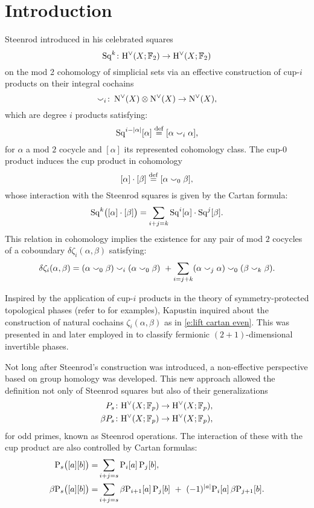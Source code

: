
\section{Introduction} \label{s:introduction}

Steenrod introduced in \cite{steenrod1947products} his celebrated squares
\begin{equation*}
	\operatorname{Sq}^k \colon \mathrm{H}^\vee(X; {\mathbb{F}_2}) \to \mathrm{H}^\vee(X; {\mathbb{F}_2})
\end{equation*}
on the mod 2 cohomology of simplicial sets via an effective construction of cup-$i$ products on their integral cochains
\[
\smallsmile_i \colon \operatorname{N^{\vee}}(X) \otimes \operatorname{N^{\vee}}(X) \to \operatorname{N^{\vee}}(X),
\]
which are degree $i$ products satisfying:
\[
\operatorname{Sq}^{i-\lvert\alpha\rvert}[\alpha] \stackrel{\mathrm{def}}{=} [\alpha \smallsmile_i \alpha],
\]
for $\alpha$ a mod $2$ cocycle and $[\alpha]$ its represented cohomology class.
The cup-$0$ product induces the cup product in cohomology
\[
[\alpha] \cdot [\beta] \stackrel{\mathrm{def}}{=} [\alpha \smallsmile_0 \beta],
\]
whose interaction with the Steenrod squares is given by the Cartan formula:
\[
\operatorname{Sq}^k\!\big([\alpha] \cdot [\beta]\big) = \sum_{i+j=k} \operatorname{Sq}^i [\alpha] \cdot \operatorname{Sq}^j[\beta].
\]
This relation in cohomology implies the existence  for any pair of mod $2$ cocycles of a coboundary $\delta\zeta_i(\alpha,\beta)$ satisfying:
\begin{equation}\label{e:lift cartan even}
	\delta\zeta_i(\alpha, \beta) =
	(\alpha \smallsmile_0 \beta) \smallsmile_i (\alpha \smallsmile_0 \beta) \ +
	\sum_{i=j+k} (\alpha \smallsmile_j \alpha) \smallsmile_0 (\beta \smallsmile_k \beta).
\end{equation}

Inspired by the application of cup-$i$ products in the theory of symmetry-protected topological phases (refer to \cite{kapustin2015cobordism, gaiotto2016spin, kapustin2017fermionic} for examples), Kapustin inquired about the construction of natural cochains $\zeta_i(\alpha, \beta)$ as in \eqref{e:lift cartan even}.
This was presented in \cite{medina2020cartan} and later employed in \cite{barkeshli2021classification} to classify fermionic $(2+1)$-dimensional invertible phases.

Not long after Steenrod's construction was introduced, a non-effective perspective based on group homology was developed.
This new approach allowed the definition not only of Steenrod squares but also of their generalizations
\begin{align*}
	P_s \colon& \mathrm{H}^\vee(X; {\mathbb{F}_p}) \to \mathrm{H}^\vee(X; {\mathbb{F}_p}), \\
	\beta P_s \colon& \mathrm{H}^\vee(X; {\mathbb{F}_p}) \to \mathrm{H}^\vee(X; {\mathbb{F}_p}),
\end{align*}
for odd primes, known as Steenrod operations.
The interaction of these with the cup product are also controlled by Cartan formulas:
\begin{align*}
	\mathrm{P}_s\big([a][b]\big) =&
	\sum_{i+j=s} \mathrm{P}_i[a] \, \mathrm{P}_j[b], \\
	\beta\mathrm{P}_s\big([a][b]\big) =&
	\sum_{i+j=s} \beta\mathrm{P}_{i+1}[a] \, \mathrm{P}_j[b] \ +\ (-1)^{\lvert a\rvert} \mathrm{P}_i[a] \, \beta\mathrm{P}_{j+1}[b].
\end{align*}

